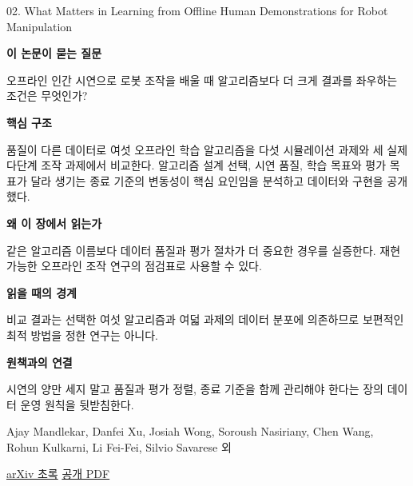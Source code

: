 \documentclass[11pt,openany]{book}
\begin{document}
\begin{termcard}{02. What Matters in Learning from Offline Human Demonstrations for Robot Manipulation}

\par

\medskip

{\sffamily\bfseries\color{deepblue} 이 논문이 묻는 질문}\par

오프라인 인간 시연으로 로봇 조작을 배울 때 알고리즘보다 더 크게 결과를 좌우하는 조건은 무엇인가?

\smallskip

{\sffamily\bfseries\color{deepblue} 핵심 구조}\par

품질이 다른 데이터로 여섯 오프라인 학습 알고리즘을 다섯 시뮬레이션 과제와 세 실제 다단계 조작 과제에서 비교한다. 알고리즘 설계 선택, 시연 품질, 학습 목표와 평가 목표가 달라 생기는 종료 기준의 변동성이 핵심 요인임을 분석하고 데이터와 구현을 공개했다.

\smallskip

{\sffamily\bfseries\color{deepblue} 왜 이 장에서 읽는가}\par

같은 알고리즘 이름보다 데이터 품질과 평가 절차가 더 중요한 경우를 실증한다. 재현 가능한 오프라인 조작 연구의 점검표로 사용할 수 있다.

\smallskip

{\sffamily\bfseries\color{coral} 읽을 때의 경계}\par

비교 결과는 선택한 여섯 알고리즘과 여덟 과제의 데이터 분포에 의존하므로 보편적인 최적 방법을 정한 연구는 아니다.

\smallskip

{\sffamily\bfseries\color{teal} 원책과의 연결}\par

시연의 양만 세지 말고 품질과 평가 정렬, 종료 기준을 함께 관리해야 한다는 장의 데이터 운영 원칙을 뒷받침한다.

\medskip

{\footnotesize\color{muted} Ajay Mandlekar, Danfei Xu, Josiah Wong, Soroush Nasiriany, Chen Wang, Rohun Kulkarni, Li Fei-Fei, Silvio Savarese 외\par

\href{https://arxiv.org/abs/2108.03298}{arXiv 초록} \quad \href{https://arxiv.org/pdf/2108.03298}{공개 PDF}\par}

\end{termcard}
\end{document}

